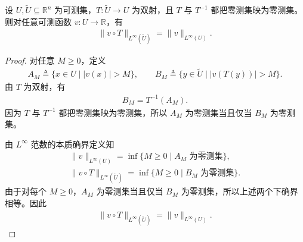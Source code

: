 \documentclass[../../main.tex]{subfiles}%
\begin{document}
\begin{lemma}\label{lemma:零测集双射保Linfty范数}
设 $U,\widetilde U\subseteq\mathbb{R}^n$ 为可测集，$T:\widetilde U\to U$ 为双射，且 $T$ 与 $T^{-1}$ 都把零测集映为零测集。则对任意可测函数 $v:U\to\mathbb{R}$，有
\begin{align*}
\|v\circ T\|_{L^\infty(\widetilde U)}=\|v\|_{L^\infty(U)}.
\end{align*}
\end{lemma}
\begin{proof}

对任意 $M\geqslant 0$，定义
\begin{align*}
A_M\triangleq\{x\in U\mid |v(x)|>M\},\qquad
B_M\triangleq\{y\in\widetilde U\mid |v(T(y))|>M\}.
\end{align*}
由 $T$ 为双射，有
\begin{align*}
B_M=T^{-1}(A_M).
\end{align*}
因为 $T$ 与 $T^{-1}$ 都把零测集映为零测集，所以 $A_M$ 为零测集当且仅当 $B_M$ 为零测集。

由 $L^\infty$ 范数的本质确界定义知
\begin{gather*}
\|v\|_{L^\infty(U)}
=\inf\{M\geqslant 0\mid A_M\text{ 为零测集}\},\\
\|v\circ T\|_{L^\infty(\widetilde U)}
=\inf\{M\geqslant 0\mid B_M\text{ 为零测集}\}.
\end{gather*}
由于对每个 $M\geqslant 0$，$A_M$ 为零测集当且仅当 $B_M$ 为零测集，所以上述两个下确界相等。因此
\begin{align*}
\|v\circ T\|_{L^\infty(\widetilde U)}=\|v\|_{L^\infty(U)}.
\end{align*}
\end{proof}
\end{document}
